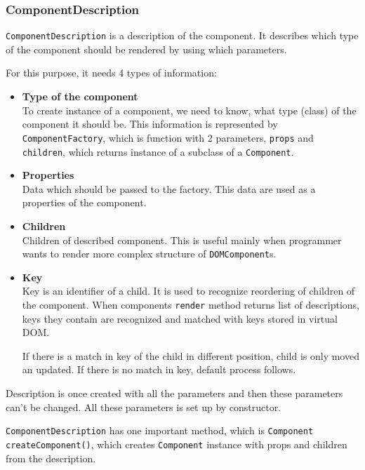 \documentclass[oneside, 12pt]{book}
\begin{document}
    \subsubsection{ComponentDescription}\label{subsubsec:our-architecture-core-component-description}
      \texttt{ComponentDescription} is a description of the component. 
      It describes which type of the component should be rendered by using which parameters.

      For this purpose, it needs 4 types of information:
      \begin{itemize}
        \item \textbf{Type of the component} \hfill \\
          To create instance of a component, we need to know, what type (class) of the component it should be. 
          This information is represented by \texttt{ComponentFactory}, 
          which is function with 2 parameters, \texttt{props} and \texttt{children}, 
          which returns instance of a subclass of a \texttt{Component}.
        \item \textbf{Properties} \hfill \\
          Data which should be passed to the factory. 
          This data are used as a properties of the component.
        \item \textbf{Children} \hfill \\
          Children of described component.  
          This is useful mainly when programmer wants to render more complex structure of \texttt{DOMComponent}s.
        \item \textbf{Key} \hfill \\
          Key is an identifier of a child. 
          It is used to recognize reordering of children of the component.
          When components \texttt{render} method returns list of descriptions, 
          keys they contain are recognized and matched with keys stored in virtual DOM.

          If there is a match in key of the child in different position, child is only moved an updated. 
          If there is no match in key, default process follows.
      \end{itemize}

      Description is once created with all the parameters and then these parameters can't be changed. 
      All these parameters is set up by constructor. 

      \texttt{ComponentDescription} has one important method, which is \texttt{Component createComponent()}, 
      which creates \texttt{Component} instance with props and children from the description.
\end{document}
